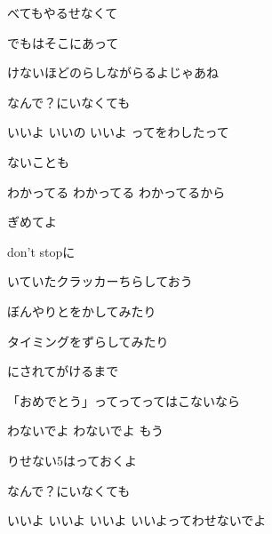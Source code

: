 \documentclass[a4paper,tate,twocolumn,12pt]{ltjtarticle}
\begin{document}
\begin{flushleft}
\begin{minipage}{\linewidth}
べてもやるせなくて

でもはそこにあって

けないほどのらしながらるよじゃあね
\end{minipage}

\vspace{2em}

\noindent\begin{minipage}{\linewidth}
なんで？にいなくても

いいよ いいの いいよ ってをわしたって

ないことも

わかってる わかってる わかってるから

ぎめてよ

don't stopに

いていたクラッカーちらしておう
\end{minipage}

\vspace{2em}

\noindent\begin{minipage}{\linewidth}
ぼんやりとをかしてみたり

タイミングをずらしてみたり

にされてがけるまで
\end{minipage}

\vspace{2em}

\noindent\begin{minipage}{\linewidth}
「おめでとう」ってってってはこないなら

わないでよ わないでよ もう

りせない5はっておくよ
\end{minipage}

\vspace{2em}

\noindent\begin{minipage}{\linewidth}
なんで？にいなくても

いいよ いいよ いいよ いいよってわせないでよ


\end{minipage}
\end{flushleft}
\end{document}
